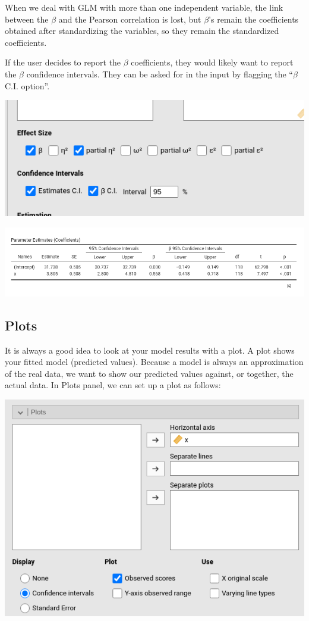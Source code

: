 \documentclass[
]{book}
\begin{document}
When we deal with GLM with more than one independent variable, the link between the \(\beta\) and the Pearson correlation is lost, but \(\beta\)'s remain the coefficients obtained after standardizing the variables, so they remain the standardized coefficients.

If the user decides to report the \(\beta\) coefficients, they would likely want to report the \(\beta\) confidence intervals. They can be asked for in the input by flagging the ``\(\beta\) C.I. option''.

\includegraphics[width=0.6\linewidth]{bookletpics/2_simple_input9}

\includegraphics[width=0.9\linewidth]{bookletpics/2_simple_output9}

\hypertarget{glmplot}{%
\subsection{Plots}\label{glmplot}}

It is always a good idea to look at your model results with a plot. A plot shows your fitted model (predicted values). Because a model is always an approximation of the real data, we want to show our predicted values against, or together, the actual data. In {Plots} panel, we can set up a plot as follows:

\includegraphics[width=0.7\linewidth]{bookletpics/2_input3}
\end{document}
